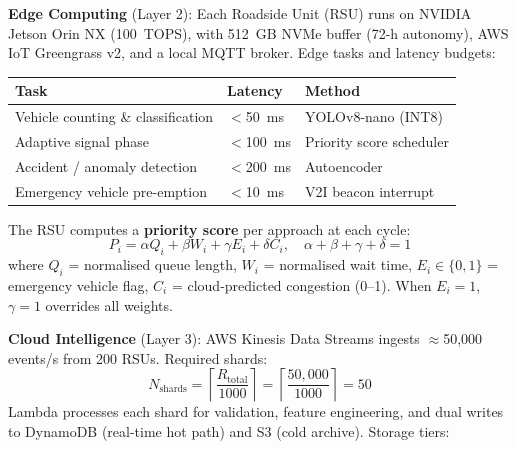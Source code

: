 \documentclass[11pt,a4paper]{article}
\begin{document}
\vspace{3pt}
\noindent\textbf{Edge Computing} (Layer 2): Each Roadside Unit (RSU) runs on NVIDIA Jetson Orin NX (100~TOPS), with 512~GB NVMe buffer (72-h autonomy), AWS IoT Greengrass v2, and a local MQTT broker. Edge tasks and latency budgets:

\vspace{3pt}
\renewcommand{\arraystretch}{1.2}
\begin{center}
\begin{tabular}{|L{5.5cm}|L{2.5cm}|L{3.5cm}|}
\hline
\textbf{Task} & \textbf{Latency} & \textbf{Method} \\
\hline
Vehicle counting \& classification & $<$50~ms & YOLOv8-nano (INT8) \\
\hline
Adaptive signal phase & $<$100~ms & Priority score scheduler \\
\hline
Accident / anomaly detection & $<$200~ms & Autoencoder \\
\hline
Emergency vehicle pre-emption & $<$10~ms & V2I beacon interrupt \\
\hline
\end{tabular}
\end{center}

\vspace{3pt}
\noindent The RSU computes a \textbf{priority score} per approach at each cycle:
\begin{equation}
  P_i = \alpha Q_i + \beta W_i + \gamma E_i + \delta C_i, \quad \alpha+\beta+\gamma+\delta=1
  \label{eq:priority}
\end{equation}
where $Q_i$ = normalised queue length, $W_i$ = normalised wait time, $E_i\!\in\!\{0,1\}$ = emergency vehicle flag, $C_i$ = cloud-predicted congestion (0--1). When $E_i=1$, $\gamma=1$ overrides all weights.

\vspace{3pt}
\noindent\textbf{Cloud Intelligence} (Layer 3): AWS Kinesis Data Streams ingests $\approx$50,000 events/s from 200 RSUs. Required shards:
\[
  N_{\text{shards}} = \left\lceil \frac{R_{\text{total}}}{1000} \right\rceil = \left\lceil \frac{50{,}000}{1000} \right\rceil = 50
\]
Lambda processes each shard for validation, feature engineering, and dual writes to DynamoDB (real-time hot path) and S3 (cold archive). Storage tiers:
\end{document}
